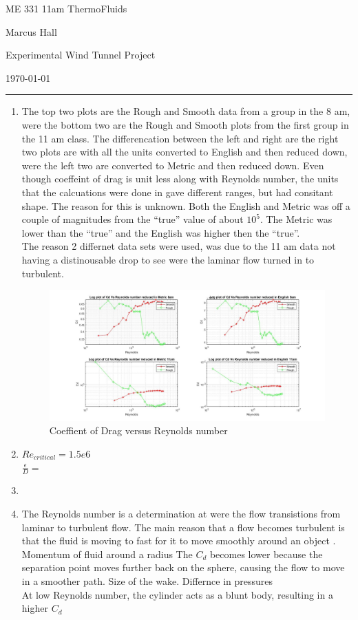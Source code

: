 \documentclass[11pt]{article}
\begin{document}
ME 331 11am ThermoFluids

Marcus Hall 

Experimental Wind Tunnel Project

\today

\medskip\hrule\medskip

\begin{enumerate}
\item The top two plots are the Rough and Smooth data from a group in the 8 am, were the bottom two are the Rough and Smooth plots from the first group in the 11 am class. The differencation between the left and right are the right two plots are with all the units converted to English and then reduced down, were the left two are converted to Metric and then reduced down. Even though coeffeint of drag is unit less along with Reynolds number, the units that the calcuations were done in gave different ranges, but had consitant shape. The reason for this is unknown. Both the English and Metric was off a couple of magnitudes from the ``true'' value of about $10^5$. The Metric was lower than the ``true'' and the English was higher then the ``true''.\\
The reason 2 differnet data sets were used, was due to the 11 am data not having a distinousable drop to see were the laminar flow turned in to turbulent.   
\begin{figure}[h]
\centering
  \includegraphics[width =7in]{x4.jpg}
  \caption{Coeffient of Drag versus Reynolds number}
  \label{fig:Cd}
\end{figure}

\item $Re_{critical} = 1.5e6 $ \\
	$\frac{\epsilon}{D} = $


\item 

\item The Reynolds number is a determination at were the flow transistions from
laminar to turbulent flow. The main reason that a flow becomes turbulent is that the
fluid is moving to fast for it to move smoothly around an object . Momentum of fluid
around a radius The $C_d$ becomes lower because the separation point moves further
back on the sphere, causing the flow to move in a smoother path. Size of the wake.
Differnce in pressures \\
At low Reynolds number, the cylinder acts as a blunt body, resulting in a higher
$C_d$ 



\end{enumerate}
\end{document}
